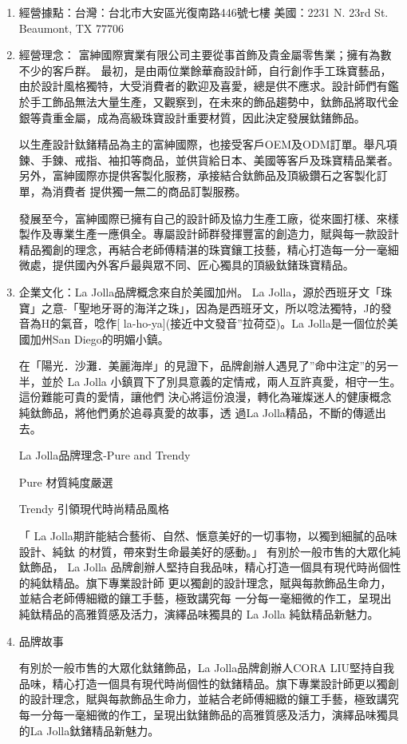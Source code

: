 \begin{enumerate}
 \item 經營據點：台灣：台北市大安區光復南路446號七樓 
               美國：2231 N. 23rd St. Beaumont, TX 77706

 \item  經營理念：
富紳國際實業有限公司主要從事首飾及貴金屬零售業；擁有為數不少的客戶群。
最初，是由兩位業餘華裔設計師，自行創作手工珠寶藝品，由於設計風格獨特，大受消費者的歡迎及喜愛，總是供不應求。設計師們有鑑於手工飾品無法大量生產，又觀察到，在未來的飾品趨勢中，鈦飾品將取代金銀等貴重金屬，成為高級珠寶設計重要材質，因此決定發展鈦鍺飾品。

以生產設計鈦鍺精品為主的富紳國際，也接受客戶OEM及ODM訂單。舉凡項鍊、手鍊、戒指、袖扣等商品，並供貨給日本、美國等客戶及珠寶精品業者。
另外，富紳國際亦提供客製化服務，承接結合鈦飾品及頂級鑽石之客製化訂單，為消費者
提供獨一無二的商品訂製服務。

發展至今，富紳國際已擁有自己的設計師及協力生產工廠，從來圖打樣、來樣製作及專業生產一應俱全。專屬設計師群發揮豐富的創造力，賦與每一款設計精品獨創的理念，再結合老師傅精湛的珠寶鑲工技藝，精心打造每一分一毫細微處，提供國內外客戶最與眾不同、匠心獨具的頂級鈦鍺珠寶精品。

 \item 企業文化：La Jolla品牌概念來自於美國加州。 La Jolla，源於西班牙文「珠寶」之意-「聖地牙哥的海洋之珠」，因為是西班牙文，所以唸法獨特，J的發音為H的氣音，唸作[ la-ho-ya](接近中文發音”拉荷亞)。La Jolla是一個位於美國加州San Diego的明媚小鎮。

在「陽光．沙灘．美麗海岸」的見證下，品牌創辦人遇見了”命中注定”的另一半，並於 La Jolla
小鎮買下了別具意義的定情戒，兩人互許真愛，相守一生。這份難能可貴的愛情，讓他們
決心將這份浪漫，轉化為璀燦迷人的健康概念純鈦飾品，將他們勇於追尋真愛的故事，透
過La Jolla精品，不斷的傳遞出去。

La Jolla品牌理念-Pure and  Trendy

Pure 材質純度嚴選 

Trendy 引領現代時尚精品風格 

「 La Jolla期許能結合藝術、自然、愜意美好的一切事物，以獨到細膩的品味設計、純鈦
的材質，帶來對生命最美好的感動。」 有別於一般市售的大眾化純鈦飾品， La Jolla
品牌創辦人堅持自我品味，精心打造一個具有現代時尚個性的純鈦精品。旗下專業設計師
更以獨創的設計理念，賦與每款飾品生命力，並結合老師傅細緻的鑲工手藝，極致講究每
一分每一毫細微的作工，呈現出純鈦精品的高雅質感及活力，演繹品味獨具的 La Jolla
純鈦精品新魅力。
 
\item 品牌故事

有別於一般市售的大眾化鈦鍺飾品，La Jolla品牌創辦人CORA LIU堅持自我品味，精心打造一個具有現代時尚個性的鈦鍺精品。旗下專業設計師更以獨創的設計理念，賦與每款飾品生命力，並結合老師傅細緻的鑲工手藝，極致講究每一分每一毫細微的作工，呈現出鈦鍺飾品的高雅質感及活力，演繹品味獨具的La Jolla鈦鍺精品新魅力。
\end{enumerate}

